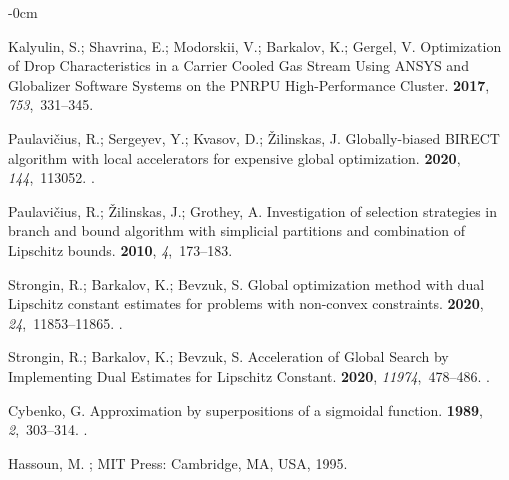 \documentclass[mathematics,article,accept,pdftex,moreauthors]{Definitions/mdpi}
\begin{document}
\begin{adjustwidth}{-\extralength}{0cm}
\begin{thebibliography}{999}
Kalyulin, S.; Shavrina, E.; Modorskii, V.; Barkalov, K.; Gergel, V.
\newblock Optimization of Drop Characteristics in a Carrier Cooled Gas Stream
  Using \uppercase{ANSYS} and \uppercase{G}lobalizer Software Systems on the
  \uppercase{PNRPU} High-Performance Cluster.
 {\bf 2017},
  {\em 753},~331--345.

Paulavi{\v c}ius, R.; Sergeyev, Y.; Kvasov, D.; {\v Z}ilinskas, J.
\newblock Globally-biased BIRECT algorithm with local accelerators for
  expensive global optimization.
 {\bf 2020}, {\em 144},~113052.
.

Paulavi{\v c}ius, R.; {\v Z}ilinskas, J.; Grothey, A.
\newblock Investigation of selection strategies in branch and bound algorithm
  with simplicial partitions and combination of \uppercase{L}ipschitz bounds.
 {\bf 2010}, {\em 4},~173--183.

Strongin, R.; Barkalov, K.; Bevzuk, S.
\newblock Global optimization method with dual Lipschitz constant estimates for
  problems with non-convex constraints.
 {\bf 2020}, {\em 24},~11853--11865.
.

Strongin, R.; Barkalov, K.; Bevzuk, S.
\newblock Acceleration of Global Search by Implementing Dual Estimates for
  Lipschitz Constant.
 {\bf 2020}, {\em
  11974},~478--486.
.

Cybenko, G.
\newblock Approximation by superpositions of a sigmoidal function.
 {\bf 1989}, {\em
  2},~303--314.
.

Hassoun, M.
; MIT Press:  Cambridge, MA, USA, 
  1995.


\end{thebibliography}
\end{adjustwidth}
\end{document}
